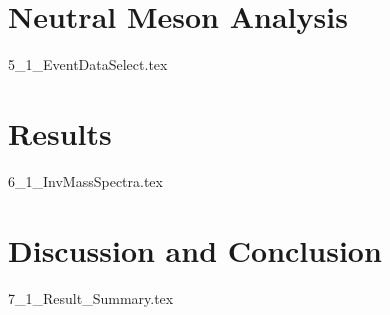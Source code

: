 \documentclass[numbered]{ohio-etd} %
\begin{document}
\chapter {Neutral Meson Analysis}
{5_1_EventDataSelect.tex}


\chapter{Results}
{6_1_InvMassSpectra.tex}


\chapter{Discussion and Conclusion}
{7_1_Result_Summary.tex}




\appendix  %




\end{document}
